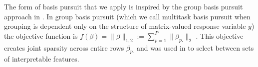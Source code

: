 The form of basis pursuit that we apply is inspired by the group basis pursuit approach in \citet{Koelle2022-ju}.
In group basis pursuit (which we call multitask basis pursuit when grouping is dependent only on the structure of matrix-valued response variable $y$) the objective function is $f(\beta) = \|\beta\|_{1,2} := \sum_{p=1}^P \|\beta_{p.}\|_2$  \citep{Yuan2006-bt, Obozinski2006-kq, Yeung2011-fg}.
This objective creates joint sparsity across entire rows $\beta_{p.}$ and was used in \citet{Koelle2022-ju} to select between sets of interpretable features.